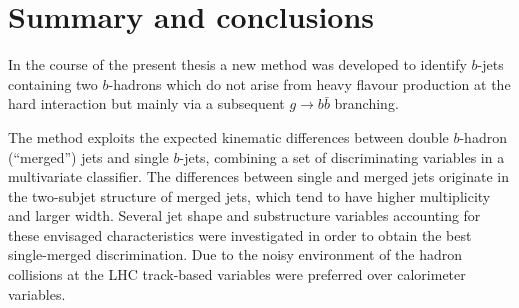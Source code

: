 %
%
\chapter{Summary and conclusions}\label{ch:conclusions}

In the course of the present thesis a new method was developed  %
to identify $b$-jets containing two $b$-hadrons which do not arise from heavy flavour production at the hard interaction but mainly via a subsequent $g \rightarrow b\bar{b}$ branching.

The method exploits the expected kinematic differences between double $b$-hadron (``merged'') jets and single $b$-jets, combining a set of discriminating variables in a multivariate classifier.  The differences between single and merged jets originate in the two-subjet structure of merged jets,  %
which tend to have higher multiplicity and larger width. Several jet shape and substructure variables accounting for these envisaged characteristics were investigated in order to obtain the best single-merged discrimination.  Due to the noisy environment of the hadron collisions at the LHC track-based variables were preferred over calorimeter variables.   %

